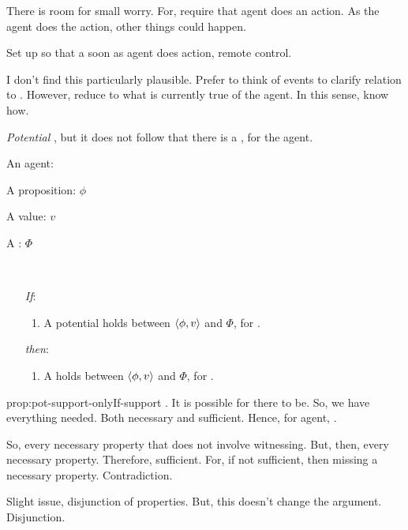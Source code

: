 \begin{note}
  There is room for small worry.
  For, require that agent does an action.
  As the agent does the action, other things could happen.

  Set up so that a soon as agent does action, remote control.

  I don't find this particularly plausible.
  Prefer to think of events to clarify relation to \supportI{}.
  However, reduce to what is currently true of the agent.
  In this sense, know how.
\end{note}

\begin{note}
  \emph{Potential} \ros{}, but it does not follow that there is a \ros{}, for the agent.
\end{note}

\begin{note}
  \begin{proposition}
    \label{prop:pot-support-onlyIf-support}
    \begin{itemize*}[noitemsep, label=\(\circ\)]
    \item
      An agent: \vAgent{}
    \item
      A proposition: \(\phi\)
    \item
      A value: \(v\)
    \item
      A : \(\Phi\)
    \item
      \mbox{ }
    \end{itemize*}

    \begin{enumerate}
    \item[\emph{If}:]
      \begin{enumerate}[label=\alph*., ref=(\alph*.)]
      \item
        A potential \ros{} holds between \(\langle \phi, v \rangle\) and \(\Phi\), for \vAgent{}.
      \end{enumerate}
    \item[\emph{then}:]
      \begin{enumerate}[label=\alph*., ref=(\alph*.), resume]
      \item
        A  holds between \(\langle \phi, v \rangle\) and \(\Phi\), for \vAgent{}.
      \end{enumerate}
    \end{enumerate}
    \vspace{-\baselineskip}
  \end{proposition}

  \begin{argument}{prop:pot-support-onlyIf-support}
    \supportII{}.
    It is possible for there to be.
    So, we have everything needed.
    Both necessary and sufficient.
    Hence, for agent, \ros{}.

    So, every necessary property that does not involve witnessing.
    But, then, every necessary property.
    Therefore, sufficient.
    For, if not sufficient, then missing a necessary property.
    Contradiction.

    Slight issue, disjunction of properties.
    But, this doesn't change the argument.
    Disjunction.
  \end{argument}
\end{note}

